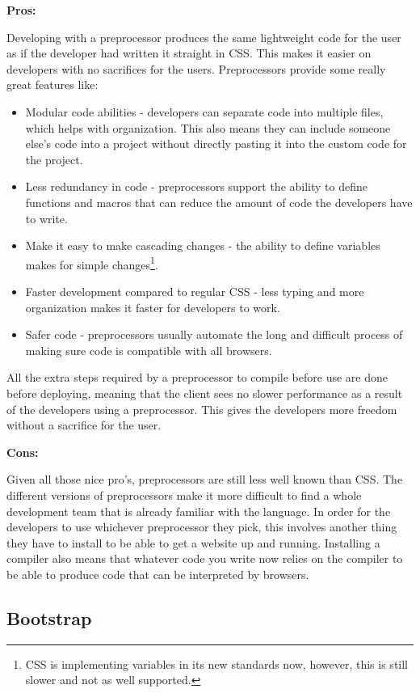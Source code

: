 \documentclass[draftclsnofoot,onecolumn,letterpaper,10pt,compsoc]{IEEEtran}
\begin{document}
    \textbf{Pros:}

     Developing with a preprocessor produces the same lightweight code for the user as if the developer had written it straight in CSS. This makes it easier on developers with no sacrifices for the users. Preprocessors provide some really great features like:
     \begin{itemize}
       \item Modular code abilities - developers can separate code into multiple files, which helps with organization. This also means they can include someone else's code into a project without directly pasting it into the custom code for the project.
       \item Less redundancy in code - preprocessors support the ability to define functions and macros that can reduce the amount of code the developers have to write.
       \item Make it easy to make cascading changes - the ability to define variables makes for simple changes\footnote{CSS is implementing variables in its new standards now, however, this is still slower and not as well supported.}.
       \item Faster development compared to regular CSS - less typing and more organization makes it faster for developers to work.
       \item Safer code - preprocessors usually automate the long and difficult process of making sure code is compatible with all browsers.
     \end{itemize}

     All the extra steps required by a preprocessor to compile before use are done before deploying, meaning that the client sees no slower performance as a result of the developers using a preprocessor.
     This gives the developers more freedom without a sacrifice for the user.

    \textbf{Cons:}

    Given all those nice pro's, preprocessors are still less well known than CSS.
    The different versions of preprocessors make it more difficult to find a whole development team that is already familiar with the language.
    In order for the developers to use whichever preprocessor they pick, this involves another thing they have to install to be able to get a website up and running.
    Installing a compiler also means that whatever code you write now relies on the compiler to be able to produce code that can be interpreted by browsers.


	\subsection{Bootstrap}
\end{document}
